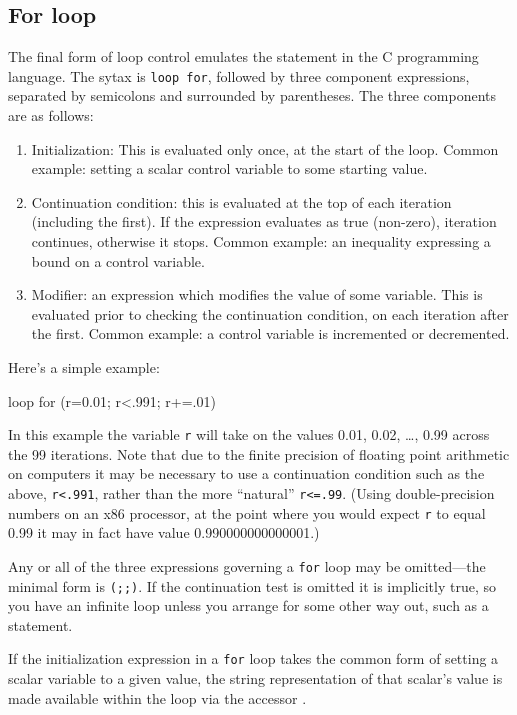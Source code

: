 \subsection{For loop}
\label{loop-for}

The final form of loop control emulates the  statement in the
C programming language.  The sytax is \texttt{loop for}, followed by
three component expressions, separated by semicolons and surrounded by
parentheses.  The three components are as follows:

\begin{enumerate}
\item Initialization: This is evaluated only once, at the start of the
  loop.  Common example: setting a scalar control variable to some
  starting value.
\item Continuation condition: this is evaluated at the top of each
  iteration (including the first).  If the expression evaluates as
  true (non-zero), iteration continues, otherwise it stops. Common
  example: an inequality expressing a bound on a control variable.
\item Modifier: an expression which modifies the value of
  some variable.  This is evaluated prior to checking the
  continuation condition, on each iteration after the first.
  Common example: a control variable is incremented or
  decremented.
\end{enumerate}

Here's a simple example:
%
\begin{code}
loop for (r=0.01; r<.991; r+=.01)
\end{code}

In this example the variable \verb+r+ will take on the values 0.01,
0.02, \dots{}, 0.99 across the 99 iterations.  Note that due to the
finite precision of floating point arithmetic on computers it may be
necessary to use a continuation condition such as the above,
\verb+r<.991+, rather than the more ``natural'' \verb+r<=.99+.  (Using
double-precision numbers on an x86 processor, at the point where you
would expect \verb+r+ to equal 0.99 it may in fact have value
0.990000000000001.)

Any or all of the three expressions governing a \texttt{for} loop may
be omitted---the minimal form is \texttt{(;;)}.  If the continuation
test is omitted it is implicitly true, so you have an infinite loop
unless you arrange for some other way out, such as a 
statement.

If the initialization expression in a \texttt{for} loop takes the
common form of setting a scalar variable to a given value, the string
representation of that scalar's value is made available within
the loop via the accessor .  



